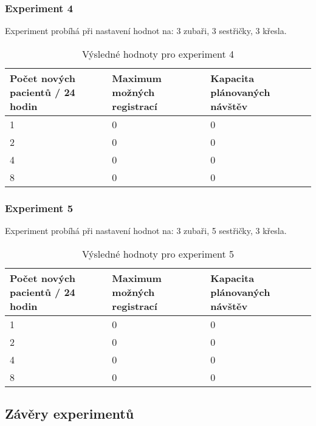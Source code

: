 \documentclass[a4paper,11pt,titlepage]{article}
\begin{document}
\subsubsection{Experiment 4}

Experiment probíhá při nastavení hodnot na: 3 zubaři, 3 sestřičky, 3 křesla.

\begin{table}[h!]
\centering
\begin{tabular}{|l|l|l|}
\hline
Počet nových pacientů / 24 hodin & Maximum možných registrací & Kapacita plánovaných návštěv \\ \hline
1        & 0                	& 0           		\\ \hline
2       & 0          		& 0           		\\ \hline
4       & 0   			& 0        		\\ \hline
8       & 0   			& 0           		\\ \hline
\end{tabular}
\caption {Výsledné hodnoty pro experiment 4} \label{tab:title} 
\end{table}

\subsubsection{Experiment 5}

Experiment probíhá při nastavení hodnot na: 3 zubaři, 5 sestřičky, 3 křesla.

\begin{table}[h!]
\centering
\begin{tabular}{|l|l|l|}
\hline
Počet nových pacientů / 24 hodin & Maximum možných registrací & Kapacita plánovaných návštěv \\ \hline
1        & 0                	& 0           		\\ \hline
2       & 0          		& 0           		\\ \hline
4       & 0   			& 0        		\\ \hline
8       & 0   			& 0           		\\ \hline
\end{tabular}
\caption {Výsledné hodnoty pro experiment 5} \label{tab:title} 
\end{table}

\subsection{Závěry experimentů}
\end{document}
